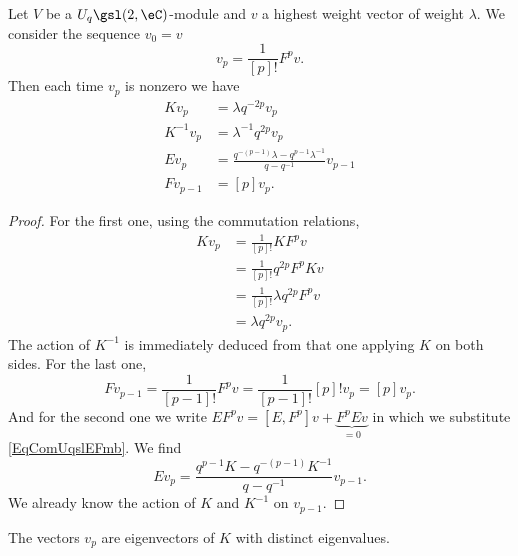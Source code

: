 \begin{proposition}
	Let \( V\) be a \( U_q\gsl(2,\eC)\)-module and \( v\) a highest weight vector of weight \( \lambda\). We consider the sequence \( v_0=v\)
	\begin{equation}
		v_p=\frac{1}{  [p]! }F^pv.
	\end{equation}
	Then each time \( v_p\) is nonzero we have
	\begin{subequations}        \label{subeqsActionUqsldcVp}
		\begin{align}
			K v_p        & =\lambda q^{-2p}v_p       \label{EqKvpqdpvp}                       \\
			K^{-1} v_{p} & =\lambda^{-1}q^{2p}v_p                                             \\
			E v_p        & =\frac{ q^{-(p-1)}\lambda-q^{p-1}\lambda^{-1} }{ q-q^{-1} }v_{p-1} \\
			F v_{p-1}    & =[p]v_p.
		\end{align}
	\end{subequations}
\end{proposition}

\begin{proof}
	For the first one, using the commutation relations,
	\begin{subequations}
		\begin{align}
			Kv_p & =\frac{1}{ [p]! }KF^pv                \\
			     & =\frac{1}{ [p]! }q^{2p}F^pKv          \\
			     & =\frac{ 1 }{ [p]! }\lambda q^{2p}F^pv \\
			     & =\lambda q^{2p}v_p.
		\end{align}
	\end{subequations}
	The action of \( K^{-1}\) is immediately deduced from that one applying \( K\) on both sides. For the last one,
	\begin{equation}
		Fv_{p-1}=\frac{1}{ [p-1]! }F^pv=\frac{1}{ [p-1]! }[p]!v_p=[p]v_p.
	\end{equation}
	And for the second one we write \( EF^pv= [E,F^p]v+\underbrace{F^pEv}_{=0}\) in which we substitute \eqref{EqComUqslEFmb}.  We find
	\begin{equation}
		Ev_p=\frac{ q^{p-1}K-q^{-(p-1)}K^{-1} }{ q-q^{-1} }v_{p-1}.
	\end{equation}
	We already know the action of \( K\) and \( K^{-1}\) on \( v_{p-1}\).
\end{proof}

\begin{corollary}
	The vectors \( v_p\) are eigenvectors of \( K\) with distinct eigenvalues.
\end{corollary}

